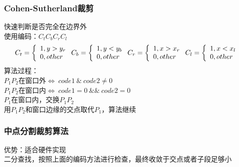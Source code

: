 \documentclass{article}
\begin{document}
\begin{CJK}{UTF8}{gbsn}
\subsubsection{Cohen-Sutherland裁剪}
快速判断是否完全在边界外\\
使用编码：$C_tC_bC_rC_l$\\
\begin{equation}
C_t=\left\lbrace 
\begin{array}{l}
1,y>y_r\\
0,other\\
\end{array}
\right.\\
C_b=\left\lbrace 
\begin{array}{l}
1,y<y_b\\
0,other\\
\end{array}
\right.\\
C_r=\left\lbrace 
\begin{array}{l}
1,x>x_r\\
0,other\\
\end{array}
\right.\\
C_l=\left\lbrace 
\begin{array}{l}
1,x<x_l\\
0,other\\
\end{array}
\right.\\	
\end{equation}
算法过程：\\
$P_1P_2$在窗口外$\Leftrightarrow\ code1\ \&\ code2 \neq 0$\\
$P_1P_2$在窗口内$\Leftrightarrow\ code1=0\ \&\&\ code2= 0$\\
$P_1$在窗口内，交换$P_1P_2$\\
用$P_1P_2$和窗口边缘的交点取代$P_1$，算法继续\\

	\subsubsection{中点分割裁剪算法}
	优势：适合硬件实现\\
	二分查找，按照上面的编码方法进行检查，最终收敛于交点或者子段足够小\\

\end{CJK}
\end{document}
